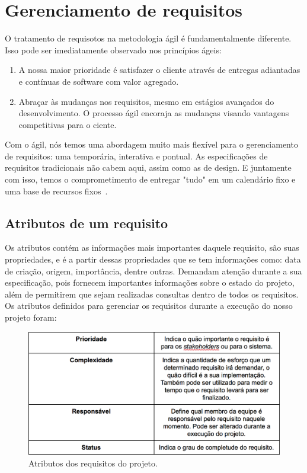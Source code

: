 \chapter[Gerenciamento de requisitos]{Gerenciamento de requisitos}
O tratamento de requisotos na metodologia ágil é fundamentalmente diferente. Isso pode ser imediatamente observado nos princípios ágeis:
\begin{enumerate}
\item A nossa maior prioridade é satisfazer o cliente através de entregas adiantadas e contínuas de software com valor agregado.
\item Abraçar às mudanças nos requisitos, mesmo em estágios avançados do desenvolvimento. O processo ágil encoraja as mudanças visando vantagens competitivas para o ciente.
\end{enumerate}

Com o ágil, nós temos uma abordagem muito mais flexível para o gerenciamento de requisitos: uma temporária, interativa e pontual. As especificações de requisitos tradicionais não cabem aqui, assim como as de design. E juntamente com isso, temos o comprometimento de entregar "tudo" em um calendário fixo e uma base de recursos fixos~\cite{leffingwell}.
\section{Atributos de um requisito}
Os atributos contém as informações mais importantes daquele requisito, são suas propriedades, e é a partir dessas propriedades que se tem informações como: data de criação, origem, importância, dentre outras. Demandam atenção durante a sua especificação, pois fornecem importantes informações sobre o estado do projeto, além de permitirem que sejam realizadas consultas dentro de todos os requisitos.
Os atributos definidos para gerenciar os requisitos durante a execução do nosso projeto foram:
  \begin{figure}[!htbp]
    \centering
    \includegraphics[scale=0.65]{figuras/tabela_atributos}
    \caption[Atributos dos requisitos do projeto]{Atributos dos requisitos do projeto. \footnotemark}
    \label{tabela_atributos}
  \end{figure}
  
